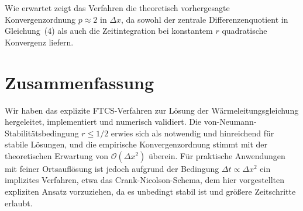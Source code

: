 \documentclass[11pt,a4paper]{article}
\begin{document}
Wie erwartet zeigt das Verfahren die theoretisch vorhergesagte Konvergenzordnung
$p \approx 2$ in $\Delta x$, da sowohl der zentrale Differenzenquotient in Gleichung~(4)
als auch die Zeitintegration bei konstantem $r$ quadratische Konvergenz liefern.

\section{Zusammenfassung}
Wir haben das explizite FTCS-Verfahren zur Lösung der Wärmeleitungsgleichung
hergeleitet, implementiert und numerisch validiert. Die von-Neumann-Stabilitätsbedingung
$r \leq 1/2$ erwies sich als notwendig und hinreichend für stabile Lösungen, und die
empirische Konvergenzordnung stimmt mit der theoretischen Erwartung von $\mathcal{O}(\Delta x^2)$
überein. Für praktische Anwendungen mit feiner Ortsauflösung ist jedoch aufgrund der
Bedingung $\Delta t \propto \Delta x^2$ ein implizites Verfahren, etwa das
Crank-Nicolson-Schema, dem hier vorgestellten expliziten Ansatz vorzuziehen, da es
unbedingt stabil ist und größere Zeitschritte erlaubt.
\end{document}
